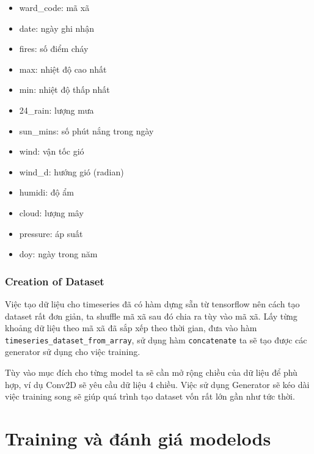 \documentclass{article}
\begin{document}
\begin{itemize}
	\item ward\_code: mã xã
	\item date: ngày ghi nhận
	\item fires: số điểm cháy
	\item max: nhiệt độ cao nhất
	\item min: nhiệt độ thấp nhất
	\item 24\_rain: lượng mưa
	\item sun\_mins: số phút nắng trong ngày
	\item wind: vận tốc gió
	\item wind\_d: hướng gió (radian)
	\item humidi: độ ẩm
	\item cloud: lượng mây
	\item pressure: áp suất
	\item doy: ngày trong năm
\end{itemize}

\subsubsection{Creation of Dataset}

\qquad Việc tạo dữ liệu cho timeseries đã có hàm dựng sẵn từ tensorflow nên cách tạo dataset rất đơn giản, ta shuffle mã xã sau đó chia ra tùy vào mã xã. Lấy từng khoảng dữ liệu theo mã xã đã sắp xếp theo thời gian, đưa vào hàm \texttt{timeseries\_dataset\_from\_array}, sử dụng hàm \texttt{concatenate} ta sẽ tạo được các generator sử dụng cho việc training.

Tùy vào mục đích cho từng model ta sẽ cần mở rộng chiều của dữ liệu để phù hợp, ví dụ Conv2D sẽ yêu cầu dữ liệu 4 chiều. Việc sử dụng Generator sẽ kéo dài việc training song sẽ giúp quá trình tạo dataset vốn rất lớn gần như tức thời.

\section{Training và đánh giá modelods}
\end{document}
